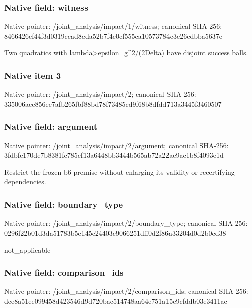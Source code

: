 \documentclass[10pt,a4paper]{article}
\begin{document}
\subsubsection{Native field: witness}
Native pointer: /joint\_\allowbreak{}analysis/impact/1/witness; canonical SHA-256: 8466426cf44f3d0319ccad8cda52b7f4e0cf555ca10573784c3e26cdbba5637e

\begingroup\raggedright\sloppy Two quadratics with lambda>epsilon\_\allowbreak{}g\textasciicircum{}2/\allowbreak{}(2Delta) have disjoint success balls.\par\endgroup

\subsubsection{Native item 3}
Native pointer: /joint\_\allowbreak{}analysis/impact/2; canonical SHA-256: 335006acc856ee7afb265fbf88bd78f73485cd9f68b8dfdd713a3445f3460507

\subsubsection{Native field: argument}
Native pointer: /joint\_\allowbreak{}analysis/impact/2/argument; canonical SHA-256: 3fdbfe170de7b8381fc785cf13a6448bb3444b565ab72a22ae9ac1b8f4093e1d

\begingroup\raggedright\sloppy Restrict the frozen b6 premise without enlarging its validity or recertifying dependencies.\par\endgroup

\subsubsection{Native field: boundary\_\allowbreak{}type}
Native pointer: /joint\_\allowbreak{}analysis/impact/2/boundary\_\allowbreak{}type; canonical SHA-256: 0296f22b01d3da51783b5e145c24403c9066251dff0d2f86a33204d0d2b0cd38

\begingroup\raggedright\sloppy not\_\allowbreak{}applicable\par\endgroup

\subsubsection{Native field: comparison\_\allowbreak{}ids}
Native pointer: /joint\_\allowbreak{}analysis/impact/2/comparison\_\allowbreak{}ids; canonical SHA-256: dce8a51ee099458d423546d9d720bac514748aa64e751a15c9cfddb03e3411ac
\end{document}
